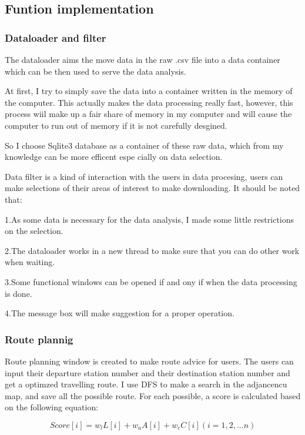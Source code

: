 \documentclass{ctexart}
\begin{document}
\subsection{Funtion implementation}
\subsubsection{Dataloader and filter}
  The dataloader aims the move data in the raw .csv file into a data container which can be then used to serve the data 
  analysis. 
  
  At first, I try to simply save the data into a container written in the memory of the computer. This actually makes 
  the data processing really fast, however, this process wiil make up a fair share of memory in my computer and 
  will cause the computer to run out of memory if it is not carefully desgined.

  So I choose Sqlite3 database as a container of these raw data, which from my knowledge can be more efficent espe
  cially on data selection. 

  Data filter is a kind of interaction with the users in data procesing, users can make selections of their areas 
  of interest to  make downloading. It should be noted that: 
  
  1.As some data is necessary for the data analysis, I made some little restrictions on the selection.

  2.The dataloader works in a new thread to make sure that you can do other work when waiting.


  3.Some functional windows can be opened if and ony if when the data processing is done.
  
  
  4.The message box will make 
  suggestion for a proper operation.



  \subsubsection{Route plannig}
  Route planning window is created to make route advice for users. The users can input their departure station number and 
  their destination station number and get a optimzed travelling route. I use DFS to make a search in the adjancencu map,
  and save all the possible route. For each possible, a score is calculated based on the following equation:

  \begin{equation}
    Score[i] = w_l{L[i]} + w_a{A[i]} + w_c{C[i]} (i=1,2, ... n)
  \end{equation}
\end{document}
